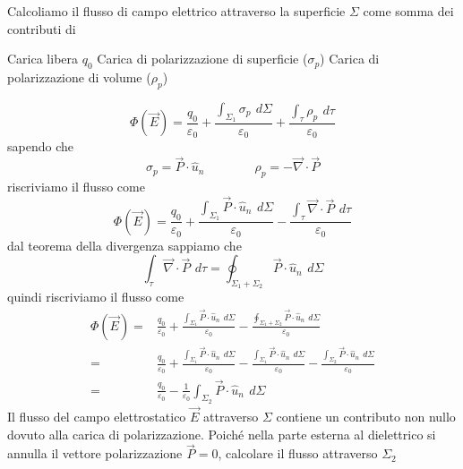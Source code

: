 \documentclass[x11names]{report}
\begin{document}
Calcoliamo il flusso di campo elettrico attraverso la superficie \(\Sigma\) come somma dei contributi di
\begin{center}
	 Carica libera \(q_0\) \hspace{0.2cm} Carica di polarizzazione di superficie (\(\sigma_p\)) \hspace{0.2cm} Carica di polarizzazione di volume (\(\rho_p\))
\end{center}

\begin{figure}[H]
	\centering
\end{figure}	
\[
\Phi(\vec{E}) = \frac{q_0}{\varepsilon_0} + \frac{\int_{\Sigma_1} \sigma_p \,\ d\Sigma}{\varepsilon_0} + \frac{\int_\tau \rho_p \,\ d\tau}{\varepsilon_0}
\]
sapendo che 
\[
\sigma_p = \vec{P}\cdot\hat{u}_n \qquad \qquad \rho_p = - \vec{\nabla}\cdot\vec{P}
\]
riscriviamo il flusso come 
\[
\Phi(\vec{E}) = \frac{q_0}{\varepsilon_0} + \frac{\int_{\Sigma_1} \vec{P}\cdot\hat{u}_n \,\ d\Sigma}{\varepsilon_0} - \frac{\int_\tau  \vec{\nabla}\cdot\vec{P} \,\ d\tau}{\varepsilon_0}
\]
dal teorema della divergenza sappiamo che 
\[
\int_\tau  \vec{\nabla}\cdot\vec{P} \,\ d\tau = \oint_{\Sigma_1 + \Sigma_2} \vec{P}\cdot\hat{u}_n \,\ d\Sigma
\]
quindi riscriviamo il flusso come 
\begin{align*}
	\Phi(\vec{E}) =& \frac{q_0}{\varepsilon_0} + \frac{\int_{\Sigma_1} \vec{P}\cdot\hat{u}_n \,\ d\Sigma}{\varepsilon_0} - \frac{ \oint_{\Sigma_1 + \Sigma_2} \vec{P}\cdot\hat{u}_n \,\ d\Sigma}{\varepsilon_0} \\
				  =& \frac{q_0}{\varepsilon_0} + \frac{\int_{\Sigma_1} \vec{P}\cdot\hat{u}_n \,\ d\Sigma}{\varepsilon_0} - \frac{ \int_{\Sigma_1} \vec{P}\cdot\hat{u}_n \,\ d\Sigma}{\varepsilon_0} - \frac{ \int_{\Sigma_2} \vec{P}\cdot\hat{u}_n \,\ d\Sigma}{\varepsilon_0} \\
				  =& \frac{q_0}{\varepsilon_0} - \frac{1}{\varepsilon_0} \int_{\Sigma_2} \vec{P}\cdot\hat{u}_n \,\ d\Sigma
\end{align*}
Il flusso del campo elettrostatico \(\vec{E}\) attraverso \(\Sigma\) contiene un contributo non nullo dovuto alla carica di polarizzazione. Poiché nella parte esterna al dielettrico si annulla il vettore polarizzazione \(\vec{P} = 0\), calcolare il flusso attraverso \(\Sigma_2\)
\end{document}
